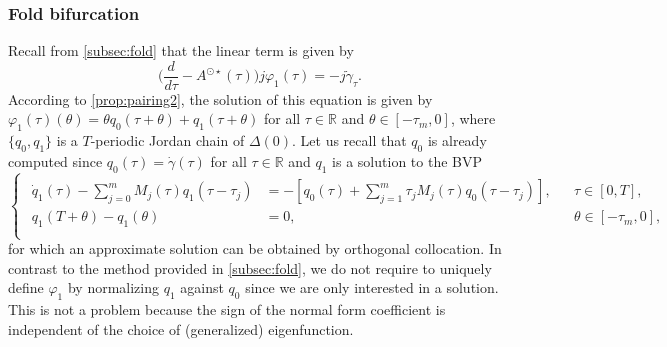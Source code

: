 \documentclass[english]{myarticle}
\begin{document}
\begin{sloppypar}
\subsubsection{Fold bifurcation}
Recall from \cref{subsec:fold} that the linear term is given by
\begin{equation*}
    \bigg(\frac{d}{d \tau} - A^{\odot \star}(\tau) \bigg)j\varphi_1(\tau) = -j\dot{\gamma}_\tau.
\end{equation*}
According to \cref{prop:pairing2}, the solution of this equation is given by $\varphi_1(\tau)(\theta) = \theta q_0(\tau+\theta) + q_1(\tau+\theta)$ for all $\tau \in \mathbb{R}$ and $\theta \in [-\tau_m,0]$, where $\{q_0,q_1\}$ is a $T$-periodic Jordan chain of $\Delta(0)$. Let us recall that $q_0$ is already computed since $q_0(\tau) = \dot{\gamma}(\tau)$ for all $\tau \in \mathbb{R}$ and $q_1$ is a solution to the BVP
\begin{equation*}
    \begin{cases}
    \begin{aligned}
    \dot{q}_1(\tau) - \textstyle\sum_{j=0}^m M_j(\tau)q_1(\tau-\tau_j) &= -[q_0(\tau) + \textstyle\sum_{j=1}^m \tau_j M_j(\tau)q_0(\tau-\tau_j)], &&\tau \in [0,T], \\
    q_1(T + \theta) - q_1(\theta) &= 0, &&\theta \in [-\tau_m,0], \\
    \end{aligned}
    \end{cases}
\end{equation*}
for which an approximate solution can be obtained by orthogonal collocation. In contrast to the method provided in \cref{subsec:fold}, we do not require to uniquely define $\varphi_1$ by normalizing $q_1$ against $q_0$ since we are only interested in a solution. This is not a problem because the sign of the normal form coefficient is independent of the choice of (generalized) eigenfunction.


\end{sloppypar}
\end{document}
